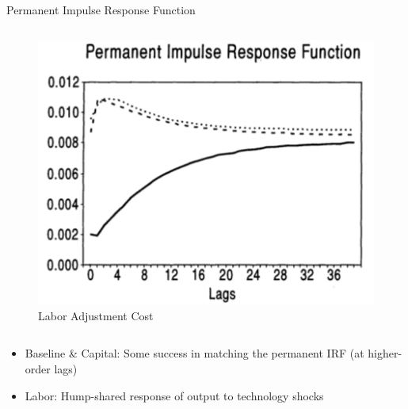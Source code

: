 \documentclass[10pt]{beamer}
\begin{document}
\begin{frame}{Permanent Impulse Response Function}
\begin{columns}[T,onlytextwidth]
        \begin{figure}
            \centering
            \includegraphics[width=\linewidth]{figures/L_per_IRF.png}
            \centering\caption{Labor Adjustment Cost}
        \end{figure}
    \end{columns}

    \begin{itemize}
        \item Baseline \& Capital: Some success in matching the permanent IRF (at
              higher-order lags)
        \item Labor: Hump-shared response of output to technology shocks
    \end{itemize}

\end{frame}
\end{document}
